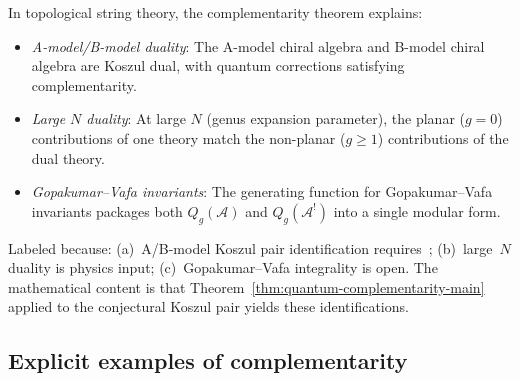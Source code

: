 \begin{conjecture}
\label{conj:string-theory-complementarity-explicit}
In topological string theory, the complementarity theorem explains:
\begin{itemize}
\item \emph{A-model/B-model duality}: The A-model chiral algebra and B-model chiral 
algebra are Koszul dual, with quantum corrections satisfying complementarity.

\item \emph{Large $N$ duality}: At large $N$ (genus expansion parameter), the 
planar ($g=0$) contributions of one theory match the non-planar ($g \geq 1$) 
contributions of the dual theory.

\item \emph{Gopakumar--Vafa invariants}: The generating function for Gopakumar--Vafa 
invariants packages both $Q_g(\mathcal{A})$ and $Q_g(\mathcal{A}^!)$ into a single 
modular form.
\end{itemize}
\end{conjecture}

\begin{remark}
Labeled \ClaimStatusHeuristic{} because: (a)~A/B-model Koszul pair
identification requires~\cite{CL16}; (b)~large~$N$ duality is
physics input; (c)~Gopakumar--Vafa integrality is open.
The mathematical content is that Theorem~\ref{thm:quantum-complementarity-main}
applied to the conjectural Koszul pair yields these identifications.
\end{remark}

\subsection{Explicit examples of complementarity}

